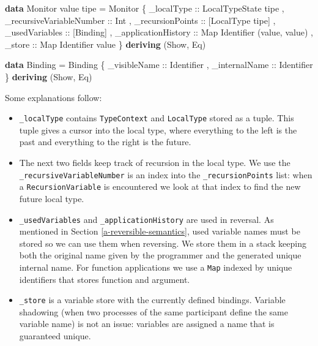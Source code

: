 \documentclass[runningheads,plain]{llncs}
\newenvironment{Shaded}{}{}
\newcommand{\KeywordTok}[1]{\textcolor[rgb]{0.00,0.44,0.13}{\textbf{#1}}}
\newcommand{\DataTypeTok}[1]{\textcolor[rgb]{0.56,0.13,0.00}{#1}}
\newcommand{\OtherTok}[1]{\textcolor[rgb]{0.00,0.44,0.13}{#1}}
\newcommand{\FunctionTok}[1]{\textcolor[rgb]{0.02,0.16,0.49}{#1}}
\newcommand{\NormalTok}[1]{#1}
\begin{document}
\begin{Shaded}
\begin{Highlighting}[]
\KeywordTok{data} \DataTypeTok{Monitor}\NormalTok{ value tipe }\FunctionTok{=} 
    \DataTypeTok{Monitor} 
\NormalTok{        \{}\OtherTok{ _localType ::} \DataTypeTok{LocalTypeState}\NormalTok{ tipe}
\NormalTok{        ,}\OtherTok{ _recursiveVariableNumber ::} \DataTypeTok{Int}
\NormalTok{        ,}\OtherTok{ _recursionPoints ::} \NormalTok{[}\DataTypeTok{LocalType}\NormalTok{ tipe]}
\NormalTok{        ,}\OtherTok{ _usedVariables ::} \NormalTok{[}\DataTypeTok{Binding}\NormalTok{]}
\NormalTok{        ,}\OtherTok{ _applicationHistory ::} \DataTypeTok{Map} \DataTypeTok{Identifier}\NormalTok{ (value, value)}
\NormalTok{        ,}\OtherTok{ _store ::} \DataTypeTok{Map} \DataTypeTok{Identifier}\NormalTok{ value }
\NormalTok{        \}}
        \KeywordTok{deriving}\NormalTok{ (}\DataTypeTok{Show}\NormalTok{, }\DataTypeTok{Eq}\NormalTok{)}

\KeywordTok{data} \DataTypeTok{Binding} \FunctionTok{=} 
    \DataTypeTok{Binding} 
\NormalTok{        \{}\OtherTok{ _visibleName ::} \DataTypeTok{Identifier}
\NormalTok{        ,}\OtherTok{ _internalName ::} \DataTypeTok{Identifier} 
\NormalTok{        \}}
    \KeywordTok{deriving}\NormalTok{ (}\DataTypeTok{Show}\NormalTok{, }\DataTypeTok{Eq}\NormalTok{) }
\end{Highlighting}
\end{Shaded}
Some explanations follow:
\begin{itemize}
\item
  \texttt{\_localType} contains \texttt{TypeContext} and
  \texttt{LocalType} stored as a tuple. This tuple gives a cursor into
  the local type, where everything to the left is the past and
  everything to the right is the future.
\item
  The next two fields keep track of recursion in the local
  type. We use the \texttt{\_recursiveVariableNumber} is an index into the
  \texttt{\_recursionPoints} list: when a \texttt{RecursionVariable} is
  encountered we look at that index to find the new future local type.
\item
  \texttt{\_usedVariables} and \texttt{\_applicationHistory} are used in
  reversal. As mentioned in Section \ref{a-reversible-semantics}, used
  variable names must be stored so we can use them when
  reversing. We store them in a stack keeping both the original name
  given by the programmer and the generated unique internal name. For
  function applications we use a \texttt{Map} indexed by unique
  identifiers that stores function and argument.
\item
   \texttt{\_store} is a variable store with the currently
  defined bindings. Variable shadowing (when two processes of the same
  participant define the same variable name) is not an issue: 
  variables are assigned a name that is guaranteed unique.
\end{itemize}
\end{document}
